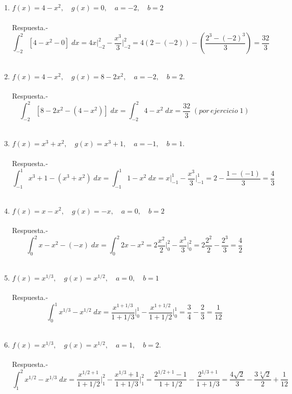 \begin{enumerate}[\bfseries 1.]

\item $f(x) = 4 - x^2, \quad g(x)=0, \quad a = -2, \quad b = 2$\\\\
    Respuesta.-\; $$\int_{-2}^2 [4-x^2 - 0] \; dx = 4x \bigg|_{-2}^2 -\dfrac{x^3}{3}\bigg|_{-2}^2 = 4(2-(-2)) - \left(\dfrac{2^3 - (-2)^3}{3}\right)  = \dfrac{32}{3}$$\\ 

\item $f(x) = 4 - x^2, \quad g(x) = 8 - 2x^2,\quad a = -2, \quad b = 2.$\\\\
    Respuesta.-\; $$\int_{-2}^2 [8 - 2x^2 - (4 - x^2)] \; dx = \int_{-2}^2 4-x^2 \; dx = \dfrac{32}{3} \; (por \, ejercicio \; 1)$$\\

\item $f(x)=x^3+x^2,\quad g(x)=x^3 + 1, \quad a=-1, \quad b=1$.\\\\
    Respuesta.-\; $$\int_{-1}^1 x^3 + 1 - (x^3 + x^2) \;dx = \int_{-1}^1 1-x^2\; dx = x\bigg|_{-1}^1 - \dfrac{x^3}{3}\bigg|_{-1}^1   = 2 - \dfrac{1-(-1)}{3} = \dfrac{4}{3}$$\\

\item $f(x)=x-x^2,\quad g(x)=-x,\quad a=0,\quad b=2$\\\\
    Respuesta.-\; $$\int_0^2 x-x^2 - (-x) \; dx = \int_0^2 2x - x^2 = 2\dfrac{x^2}{2}\bigg|_0^2 - \dfrac{x^3}{3}\bigg|_0^2 = 2\dfrac{2^2}{2} - \dfrac{2^3}{3} = \dfrac{4}{2}$$\\

\item $f(x) = x^{1/3}, \quad g(x) = x^{1/2}, \quad a=0, \quad b=1$\\\\ 
    Respuesta.-\; $$\int_0^1 x^{1/3} - x^{1/2} \; dx = \dfrac{x^{1+1/3}}{1+1/3}\bigg|_0^1 - \dfrac{x^{1+1/2}}{1+1/2}\bigg|_0^1 = \dfrac{3}{4} - \dfrac{2}{3} = \dfrac{1}{12}$$\\

\item $f(x) = x^{1/3}, \quad g(x) = x^{1/2},\quad a=1,\quad b=2.$\\\\
    Respuesta.-\; $$\int_1^2 x^{1/2}-x^{1/3}\; dx = \dfrac{x^{1/2 + 1}}{1 + 1/2}\bigg|_1^2 - \dfrac{x^{1/3}+1}{1+1/3}\bigg|_1^2 = \dfrac{2^{1/2+1}-1}{1+1/2}-\dfrac{2^{1/3+1}}{1+1/3} = \dfrac{4\sqrt{2}}{3}-\dfrac{3\sqrt[3]{2}}{2}+\dfrac{1}{12}$$\\


\end{enumerate}
